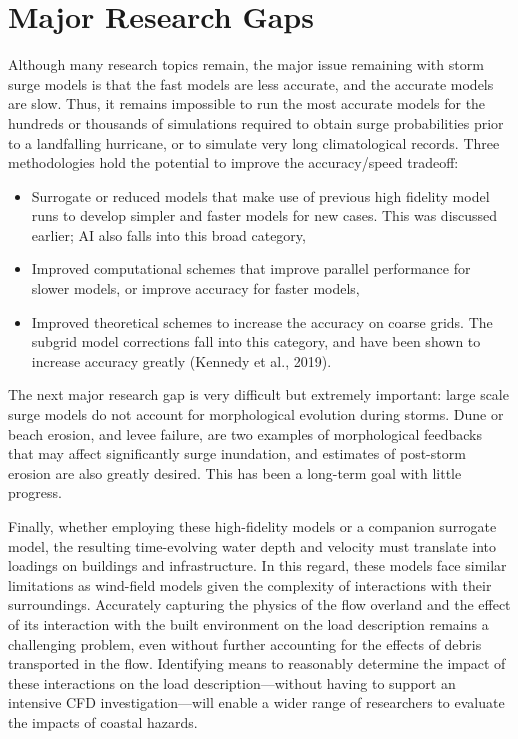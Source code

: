 \section{Major Research Gaps}
\label{sec:storm_surge_gaps}

Although many research topics remain, the major issue remaining with storm surge models is that the fast models are less accurate, and the accurate models are slow. Thus, it remains impossible to run the most accurate models for the hundreds or thousands of simulations required to obtain surge probabilities prior to a landfalling hurricane, or to simulate very long climatological records. Three methodologies hold the potential to improve the accuracy/speed tradeoff:

\begin{itemize}
    \item Surrogate or reduced models that make use of previous high fidelity model runs to develop simpler and faster models for new cases. This was discussed earlier; AI also falls into this broad category,
    \item Improved computational schemes that improve parallel performance for slower models, or improve accuracy for faster models,
    \item Improved theoretical schemes to increase the accuracy on coarse grids. The subgrid model corrections fall into this category, and have been shown to increase accuracy greatly (Kennedy et al., 2019).
\end{itemize}

The next major research gap is very difficult but extremely important: large scale surge models do not account for morphological evolution during storms. Dune or beach erosion, and levee failure, are two examples of morphological feedbacks that may affect significantly surge inundation, and estimates of post-storm erosion are also greatly desired. This has been a long-term goal with little progress.

Finally, whether employing these high-fidelity models or a companion surrogate model, the resulting time-evolving water depth and velocity must translate into loadings on buildings and infrastructure. In this regard, these models face similar limitations as wind-field models given the complexity of interactions with their surroundings. Accurately capturing the physics of the flow overland and the effect of its interaction with the built environment on the load description remains a challenging problem, even without further accounting for the effects of debris transported in the flow. Identifying means to reasonably determine the impact of these interactions on the load description—without having to support an intensive CFD investigation—will enable a wider range of researchers to evaluate the impacts of coastal hazards. 
 
